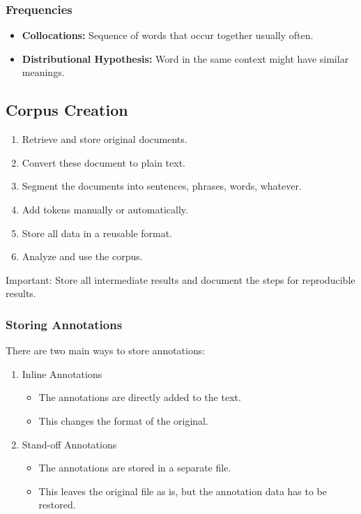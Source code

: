             \subsubsection{Frequencies} %
            	\begin{itemize}
            		\item \textbf{Collocations:} Sequence of words that occur together usually often.
            		\item \textbf{Distributional Hypothesis:} Word in the same context might have similar meanings.
            	\end{itemize}

        \subsection{Corpus Creation} %
            \begin{enumerate}
            	\item Retrieve and store original documents.
            	\item Convert these document to plain text.
            	\item Segment the documents into sentences, phrases, words, whatever.
            	\item Add tokens manually or automatically.
            	\item Store all data in a reusable format.
            	\item Analyze and use the corpus.
            \end{enumerate}
        	Important: Store all intermediate results and document the steps for reproducible results.

            \subsubsection{Storing Annotations} %
                There are two main ways to store annotations:
                \begin{enumerate}
                	\item Inline Annotations
                		\begin{itemize}
                			\item The annotations are directly added to the text.
                			\item This changes the format of the original.
                		\end{itemize}
                	\item Stand-off Annotations
                		\begin{itemize}
                			\item The annotations are stored in a separate file.
                			\item This leaves the original file as is, but the annotation data has to be restored.
                		\end{itemize}
                \end{enumerate}

